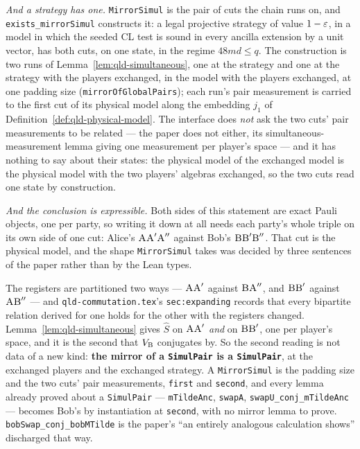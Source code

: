 \emph{And a strategy has one.} \texttt{MirrorSimul} is the pair of cuts the chain runs on, and
\texttt{exists\_mirrorSimul} constructs it: a legal projective strategy of value $1 - \varepsilon$, in a
model in which the seeded CL test is sound in every ancilla extension by a unit vector, has both
cuts, on one state, in the regime $48md \leq q$. The construction is two runs of
Lemma~\ref{lem:qld-simultaneous}, one at the strategy and one at the strategy with the players
exchanged, in the model with the players exchanged, at one padding size
(\texttt{mirrorOfGlobalPairs}); each run's pair measurement is carried to the first cut of its
physical model along the embedding $j_1$ of Definition~\ref{def:qld-physical-model}. The interface
does \emph{not} ask the two cuts' pair measurements to be related --- the paper does not either,
its simultaneous-measurement lemma giving one measurement per player's space --- and it has nothing
to say about their states: the physical model of the exchanged model is the physical model with
the two players' algebras exchanged, so the two cuts read one state by construction.

\emph{And the conclusion is expressible.} Both sides of this statement are exact Pauli objects, one
per party, so writing it down at all needs each party's whole triple on its own side of one cut:
Alice's $\textsc{A} \textsc{A}' \textsc{A}''$ against Bob's $\textsc{B} \textsc{B}' \textsc{B}''$. That cut is the physical
model, and the shape \texttt{MirrorSimul} takes was decided by three sentences of the paper rather
than by the Lean types.

The registers are partitioned two ways --- $\textsc{A} \textsc{A}'$ against $\textsc{B} \textsc{A}''$, and
$\textsc{B} \textsc{B}'$ against $\textsc{A} \textsc{B}''$ --- and \texttt{qld-commutation.tex}'s
\texttt{sec:expanding} records that every bipartite relation derived for one holds for the other
with the registers changed. Lemma~\ref{lem:qld-simultaneous} gives $\widehat{S}$ on
$\textsc{A} \textsc{A}'$ \emph{and} on $\textsc{B} \textsc{B}'$, one per player's space, and it is the second that
$V_{\textsc{B}}$ conjugates by. So the second reading is not data of a new kind: \textbf{the mirror of a
\texttt{SimulPair} is a \texttt{SimulPair}}, at the exchanged players and the exchanged strategy.
A \texttt{MirrorSimul} is the padding size and the two cuts' pair measurements, \texttt{first}
and \texttt{second}, and every lemma already proved about a \texttt{SimulPair} ---
\texttt{mTildeAnc}, \texttt{swapA}, \texttt{swapU\_conj\_mTildeAnc} --- becomes Bob's by
instantiation at \texttt{second}, with no mirror lemma to prove.
\texttt{bobSwap\_conj\_bobMTilde} is the paper's ``an entirely analogous calculation shows''
discharged that way.

